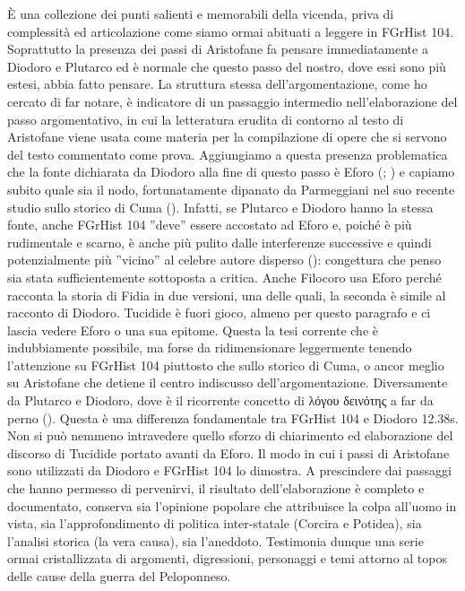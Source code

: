 {	È una collezione dei punti salienti e memorabili della vicenda, priva di complessità ed articolazione come siamo ormai abituati a leggere in FGrHist 104. Soprattutto la presenza dei passi di Aristofane  fa pensare immediatamente a  Diodoro e Plutarco ed è normale che questo passo del nostro, dove essi sono più estesi, abbia fatto pensare. La struttura stessa dell'argomentazione, come ho cercato di far notare, è indicatore di un passaggio intermedio nell'elaborazione del passo argomentativo, in cui la letteratura erudita di contorno al testo di Aristofane  viene usata come materia per la compilazione di opere che si servono del testo commentato come prova. Aggiungiamo a questa presenza problematica che la fonte dichiarata da  Diodoro alla fine di questo passo è Eforo (\cite[88]{Schepens2007}; \cite[420]{Parmeggiani2011}) e capiamo subito quale sia il nodo, fortunatamente dipanato da Parmeggiani nel suo recente studio sullo storico di Cuma (\cite[417-458]{Parmeggiani2011}). Infatti, se Plutarco e  Diodoro hanno la stessa fonte, anche FGrHist 104 ''deve'' essere accostato ad Eforo e, poiché è più rudimentale e scarno, è anche più pulito dalle interferenze successive e quindi potenzialmente più ''vicino'' al celebre autore disperso (\cite[420 n.114]{Parmeggiani2011}): congettura che penso sia stata sufficientemente sottoposta a critica. Anche Filocoro usa Eforo perché racconta la storia di Fidia in due versioni, una delle quali, la seconda è simile al racconto di Diodoro. Tucidide è fuori gioco, almeno per questo paragrafo e ci lascia vedere Eforo o una sua epitome. Questa la tesi corrente che è indubbiamente possibile, ma forse da ridimensionare leggermente tenendo l'attenzione su FGrHist 104 piuttosto che sullo storico di Cuma, o ancor meglio su Aristofane  che detiene il centro indiscusso dell'argomentazione. Diversamente da Plutarco e Diodoro, dove è il ricorrente concetto di \textgreek{λόγου δεινότης} a far da perno (\cite[419]{Parmeggiani2011}). Questa è una differenza fondamentale tra FGrHist 104 e  Diodoro 12.38s. Non si può nemmeno intravedere quello sforzo di chiarimento ed elaborazione del discorso di Tucidide portato avanti da Eforo. Il modo in cui i passi di Aristofane sono utilizzati da Diodoro e FGrHist 104 lo dimostra. A prescindere dai passaggi che hanno permesso di pervenirvi, il risultato dell'elaborazione è completo e documentato, conserva sia l'opinione popolare che attribuisce la colpa all'uomo in vista, sia l'approfondimento di politica inter-statale (Corcira e Potidea), sia l'analisi storica (la vera causa), sia l'aneddoto. Testimonia dunque una serie ormai cristallizzata di argomenti, digressioni, personaggi e temi attorno al topos delle cause della guerra del Peloponneso. 
            
}
